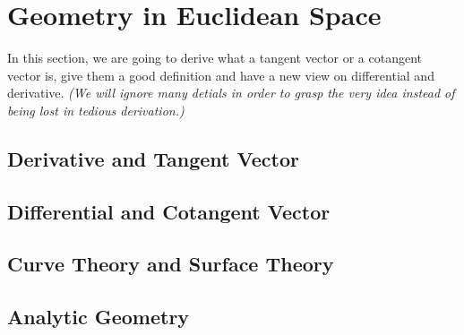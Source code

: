 \chapter{Geometry in Euclidean Space}

In this section, we are going to derive what a tangent vector or a cotangent vector is,
give them a good definition and have a new view on differential and derivative. \textit{(We will
ignore many detials in order to grasp the very idea instead of being lost in tedious derivation.)}



\section{Derivative and Tangent Vector}
\section{Differential and Cotangent Vector}
\section{Curve Theory and Surface Theory}
\section{Analytic Geometry}

